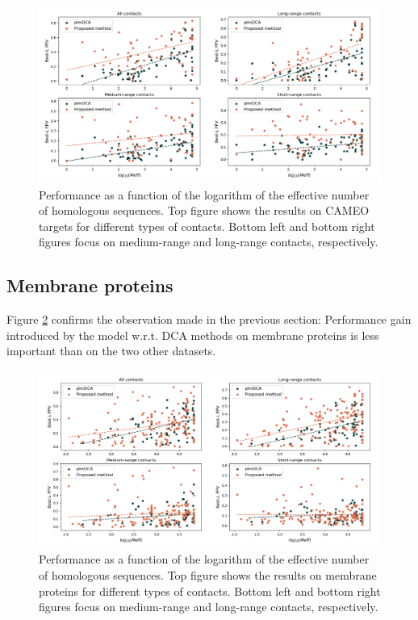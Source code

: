     \begin{figure}[H]
        \begin{center}
            \includegraphics[width=\textwidth, keepaspectratio]{imgs/Meff_cameo.png}
            \caption{Performance as a function of the logarithm of the effective
            number of homologous sequences. Top figure shows the results on
            CAMEO targets for different types of contacts. Bottom left and bottom right figures
            focus on medium-range and long-range contacts, respectively.}
            \label{sensitivity_cameo}
        \end{center}
    \end{figure}

    \subsection{Membrane proteins}

    Figure \ref{sensitivity_membrane} confirms the observation made in the previous section:
    Performance gain introduced by the model w.r.t. DCA methods on membrane proteins is
    less important than on the two other datasets.

    \begin{figure}[H]
        \begin{center}
            \includegraphics[width=\textwidth, keepaspectratio]{imgs/Meff_membrane.png}
            \caption{Performance as a function of the logarithm of the effective
            number of homologous sequences. Top figure shows the results on
            membrane proteins for different types of contacts. Bottom left and bottom right figures
            focus on medium-range and long-range contacts, respectively.}
            \label{sensitivity_membrane}
        \end{center}
    \end{figure}

